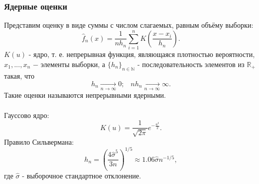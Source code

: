 \documentclass[main.tex]{subfiles}
\begin{document}
    \subsubsection{Ядерные оценки}
    \noindent Представим оценку в виде суммы с числом слагаемых, равным объёму выборки:
    \begin{equation} \label{KDE}
    	\widehat{f}_n(x)=\frac{1}{n h_n}\sum_{i=1}^n K\left(\frac{x-x_i}{h_n}\right).
    \end{equation}
        $K(u)$ - ядро, т. е. непрерывная функция, являющаяся плотностью вероятности, $x_1,...,x_n$ $-$ элементы выборки, а $\{h_n\}_{n\in\mathbb{N}}$ - последовательность элементов из $\mathbb{R}_+$ такая, что
    \begin{equation} \label{KDE:Prop}
    	h_n\xrightarrow[n\to\infty]{}0;\;\;\;n h_n\xrightarrow[n\to\infty]{}\infty.
    \end{equation}
        Такие оценки называются непрерывными ядерными.\\\\
        Гауссово ядро:
    \begin{equation} \label{KDE:Gauss}
    	K(u)=\frac{1}{\sqrt{2\pi}}e^{-\frac{u^2}{2}}.
    \end{equation}
        Правило Сильвермана:
    \begin{equation} \label{KDE:Silverman}
    	h_n=\left(\frac{4\hat{\sigma}^5}{3n}\right)^{1/5}\approx1.06\hat{\sigma}n^{-1/5},
    \end{equation}
        где $\hat{\sigma}$ - выборочное стандартное отклонение.
\end{document}
